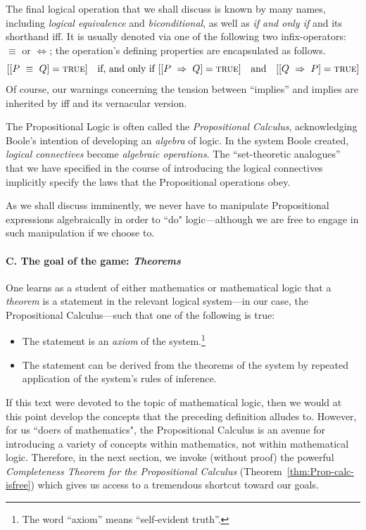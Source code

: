 \begin{itemize}
The final logical operation that we shall discuss is known by many names, including {\it logical equivalence} and {\it biconditional}, as well as {\it if and only if} and its shorthand {\sc iff}.  It is usually denoted via one of the following two infix-operators: $\equiv$ or $\Leftrightarrow$; the operation's defining properties are encapsulated as follows.
\[ 
[[P \ \equiv \ Q] = \mbox{\sc true}]  \ \ \mbox{ if, and only if }
[[P \ \Rightarrow \ Q] = \mbox{\sc true}]  \ \ \mbox{ and } \ \
[[Q \ \Rightarrow \ P] = \mbox{\sc true}]
\]
Of course, our warnings concerning the tension between ``implies'' and {\sc implies} are inherited by {\sc iff} and its vernacular version.
\end{itemize}

\medskip

The Propositional Logic is often called the {\it Propositional Calculus}, acknowledging Boole's intention of developing an {\em algebra} of logic.  In the system Boole created, {\em logical connectives} become {\em algebraic operations}.  The ``set-theoretic analogues'' that we have specified in the course of introducing the logical connectives implicitly specify the laws that the Propositional operations obey.

\smallskip

As we shall discuss imminently, we never have to manipulate Propositional expressions algebraically in order to ``do" logic---although we are free to engage in such manipulation if we choose to.

\paragraph{C. The goal of the game: {\em Theorems}}

One learns as a student of either mathematics or mathematical logic that a {\it theorem} is a statement in the relevant logical system---in our case, the Propositional Calculus---such that one of the following is true:
\begin{itemize}
\item
The statement is an {\it axiom} of the system.\footnote{The word ``axiom'' means ``self-evident truth''.}
\medskip\item
The statement can be derived from the theorems of the system by repeated application of the system's rules of inference.
\end{itemize}
If this text were devoted to the topic of mathematical logic, then we would at this point develop the concepts that the preceding definition alludes to.  However, for us ``doers of mathematics", the Propositional Calculus is an avenue for introducing a variety of concepts within mathematics, not within mathematical logic.  Therefore, in the next section, we invoke (without proof) the powerful {\it Completeness Theorem for the Propositional Calculus} (Theorem~\ref{thm:Prop-calc-isfree}) which gives us access to a tremendous shortcut toward our goals.

